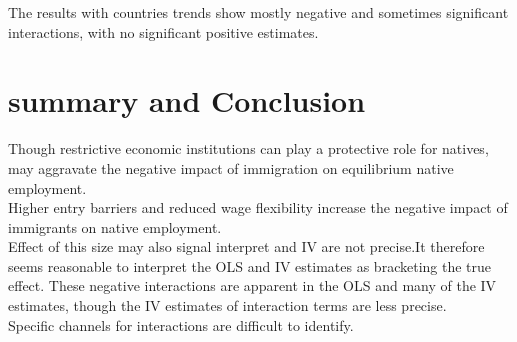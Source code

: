 \documentclass[../root]{subfiles}
\begin{document}
    The results with countries trends show mostly negative and sometimes significant interactions, with no significant positive estimates.
    
    \section{summary and Conclusion}
    Though restrictive economic institutions can play a protective role for natives, may aggravate the negative impact of immigration on equilibrium native employment. \\
    Higher entry barriers and reduced wage flexibility  increase the negative impact of immigrants on native employment. \\
    Effect of this size may also signal interpret  and IV are not precise.It therefore  seems reasonable to interpret the OLS and IV estimates as bracketing the true effect.
    These negative interactions are apparent in the OLS and many of the IV estimates, though the IV estimates of interaction terms are less precise.\\
    Specific channels for interactions are difficult to identify.
    \biblio
    
    
\end{document}
